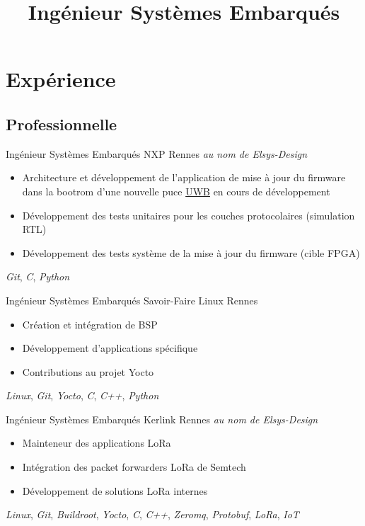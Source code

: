 \documentclass[11pt,a4paper,sans]{moderncv}
\title{Ingénieur Systèmes Embarqués}
\begin{document}
\makecvtitle

\section{Expérience}
\subsection{Professionnelle}
	{Ingénieur Systèmes Embarqués}
	{NXP}
	{Rennes}
	{\textit{au nom de Elsys-Design}}
	{
		\begin{itemize}
		\item Architecture et développement de l'application de mise à
			jour du firmware dans la bootrom d'une nouvelle puce
			\href{https://en.wikipedia.org/wiki/Ultra-wideband}{UWB}
			en cours de développement
		\item Développement des tests unitaires pour les couches
			protocolaires (simulation RTL)
		\item Développement des tests système de la mise à jour du
			firmware (cible FPGA)
		\end{itemize}
		\textit{Git},
		\textit{C}, \textit{Python}
	}
	{Ingénieur Systèmes Embarqués}
	{Savoir-Faire Linux}
	{Rennes}
	{}
	{
		\begin{itemize}
		\item Création et intégration de BSP
		\item Développement d'applications spécifique
		\item Contributions au projet Yocto
		\end{itemize}
		\textit{Linux},
		\textit{Git},
		\textit{Yocto},
		\textit{C}, \textit{C++}, \textit{Python}
	}
	{Ingénieur Systèmes Embarqués}
	{Kerlink}
	{Rennes}
	{\textit{au nom de Elsys-Design}}
	{
		\begin{itemize}
		\item Mainteneur des applications LoRa
		\item Intégration des packet forwarders LoRa de Semtech
		\item Développement de solutions LoRa internes
		\end{itemize}
		\textit{Linux},
		\textit{Git},
		\textit{Buildroot}, \textit{Yocto},
		\textit{C}, \textit{C++},
		\textit{Zeromq}, \textit{Protobuf},
		\textit{LoRa}, \textit{IoT}
	}
\end{document}
